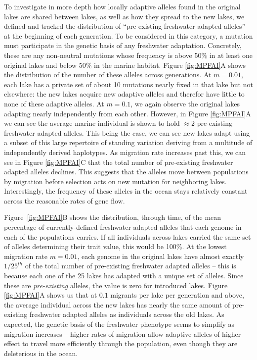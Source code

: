 \documentclass{article}
\begin{document}
To investigate in more depth how locally adaptive alleles found in the original lakes
are shared between lakes, as well as how they spread to the new lakes,
we defined and tracked the distribution of ``pre-existing freshwater adapted alleles'' at the beginning of each generation.
To be considered in this category, a mutation must participate in the genetic basis of any freshwater adaptation.
Concretely, these are any non-neutral mutations whose frequency is above 50\% in at least one original lakes and below 50\% in the marine habitat.
Figure \ref{fig:MPFAI}A shows the distribution of the number of these alleles across generations.
At $m = 0.01$, each lake has a private set of about 10 mutations nearly fixed in that lake but not elsewhere:
the new lakes acquire new adaptive alleles and therefor have little to none of these adaptive alleles.
At $m = 0.1$, we again observe the original lakes adapting nearly independently from each other.
However, in Figure \ref{fig:MPFAI}A we can see the average marine individual is shown to hold $\approx 2$ pre-existing freshwater adapted alleles. 
This being the case, we can see new lakes adapt using a subset of this large repertoire of standing variation deriving from a multitude of independently derived haplotypes.
As migration rate increases past this, %
we can see in Figure \ref{fig:MPFAI}C that the total number of pre-existing freshwater adapted alleles declines.
This suggests that the alleles move between populations by migration 
before selection acts on new mutation for neighboring lakes.
Interestingly, the frequency of these alleles in the ocean
stays relatively constant across the reasonable rates of gene flow.

Figure~\ref{fig:MPFAI}B shows the distribution, through time, of 
the mean percentage of currently-defined freshwater adapted alleles 
that each genome in each of the populations carries.
If all individuals across lakes carried the same set of alleles determining their trait value, 
this would be 100\%. 
At the lowest migration rate $m = 0.01$,
each genome in the original lakes have almost exactly~$1/25^{th}$ 
of the total number of pre-existing freshwater adapted alleles -- 
this is because each one of the 25 lakes has adapted with a unique set of alleles. 
Since these are \emph{pre-existing} alleles, the value is zero for introduced lakes.
Figure \ref{fig:MPFAI}A shows us that at $0.1$ migrants per lake per generation and above,
the average individual across the new lakes has nearly the same amount of 
pre-existing freshwater adapted alleles as individuals across the old lakes.
As expected, the genetic basis of the freshwater phenotype 
seems to simplify as migration increases --
higher rates of migration allow
adaptive alleles of higher effect to travel more efficiently through the population,
even though they are deleterious in the ocean.
\end{document}
